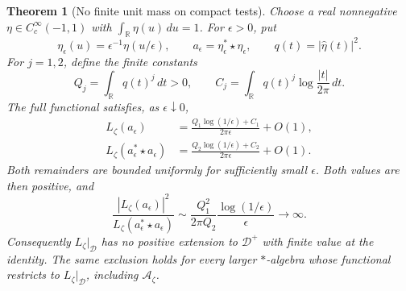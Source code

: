 \documentclass[11pt]{article}
\newtheorem{theorem}{Theorem}[section]
\theoremstyle{definition}
\theoremstyle{remark}
\numberwithin{equation}{section}
\newcommand{\cA}{\mathcal A}
\newcommand{\R}{\mathbb R}
\begin{document}
\begin{theorem}[No finite unit mass on compact tests]
\label{thm:weil-compact-mass}
Choose a real nonnegative $\eta\in C_c^\infty(-1,1)$ with
$\int_\R\eta(u)\,du=1$.  For $\epsilon>0$, put
\begin{equation}
 \eta_\epsilon(u)=\epsilon^{-1}\eta(u/\epsilon),\qquad
 a_\epsilon=\eta_\epsilon^*\star\eta_\epsilon,\qquad
 q(t)=|\widehat\eta(t)|^2.
 \label{eq:compact-concentrating-tests}
\end{equation}
For $j=1,2$, define the finite constants
\[
 Q_j=\int_\R q(t)^j\,dt>0,\qquad
 C_j=\int_\R q(t)^j\log\frac{|t|}{2\pi}\,dt.
\]
The full functional satisfies, as $\epsilon\downarrow0$,
\begin{equation}
 \begin{aligned}
 L_\zeta(a_\epsilon)
   &=\frac{Q_1\log(1/\epsilon)+C_1}{2\pi\epsilon}+O(1),\\
 L_\zeta(a_\epsilon^*\star a_\epsilon)
   &=\frac{Q_2\log(1/\epsilon)+C_2}{2\pi\epsilon}+O(1).
 \end{aligned}
 \label{eq:weil-compact-asymptotics}
\end{equation}
Both remainders are bounded uniformly for sufficiently small $\epsilon$.
Both values are then positive, and
\begin{equation}
 \frac{|L_\zeta(a_\epsilon)|^2}
      {L_\zeta(a_\epsilon^*\star a_\epsilon)}
 \sim\frac{Q_1^2}{2\pi Q_2}
                \frac{\log(1/\epsilon)}{\epsilon}
 \longrightarrow\infty.
 \label{eq:weil-compact-divergence}
\end{equation}
Consequently $L_\zeta|_{\mathscr D}$ has no positive extension to
$\mathscr D^+$ with finite value at the identity.
The same exclusion holds for every larger $*$-algebra whose functional
restricts to $L_\zeta|_{\mathscr D}$, including $\cA_\zeta$.
\end{theorem}
\end{document}
